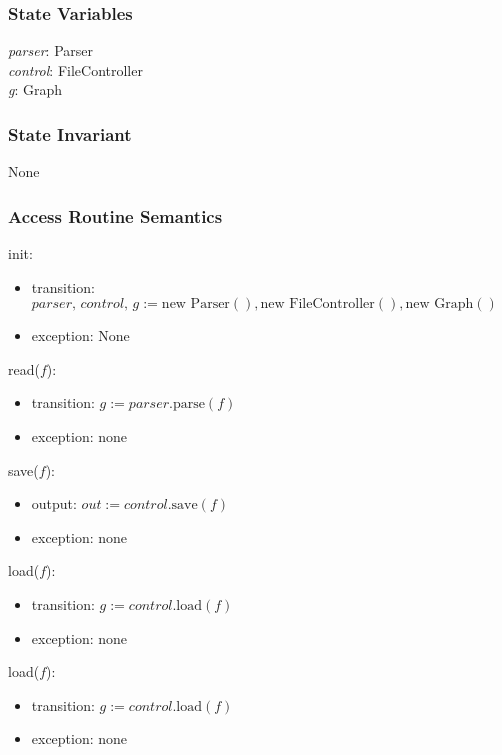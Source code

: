 \documentclass[12pt]{article}
\begin{document}
\subsubsection*{State Variables}

\textit{parser}: Parser\\
\textit{control}: FileController\\
\textit{g}: Graph

\subsubsection*{State Invariant}

None

\subsubsection*{Access Routine Semantics}

\noindent init:
\begin{itemize}
	\item transition: $\textit{parser, control, g} := \mbox{new Parser}(), \mbox{new FileController}(), \mbox{new Graph}()$
	\item exception: None
\end{itemize}

\noindent read($f$):
\begin{itemize}
	\item transition: $\textit{g} := \textit{parser}.\mbox{parse}(f)$
	\item exception: none
\end{itemize}

\noindent save($f$):
\begin{itemize}
	\item output: $out := \textit{control}.\mbox{save}(f)$
	\item exception: none
\end{itemize}

\noindent load($f$):
\begin{itemize}
	\item transition: $\textit{g} := \textit{control}.\mbox{load}(f)$
	\item exception: none
\end{itemize}

\noindent load($f$):
\begin{itemize}
	\item transition: $\textit{g} := \textit{control}.\mbox{load}(f)$
	\item exception: none
\end{itemize}
\end{document}

